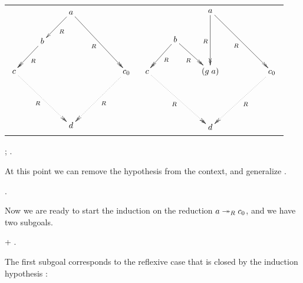         \begin{tabular}{c@{\hskip 0.5cm}c} $\xymatrix{ & & a
        \ar@{->>}[ddrr]_R \ar@{->}[dl]^R & & \\ & b \ar@{->>}[dl]^R &
        & & \\ c \ar@{.>>}[ddrr]_R & & & & c_0 \ar@{.>>}[ddll]^R \\ &
        & & & \\ & & d & & }$ & $\xymatrix{ & & a \ar@{->>}[ddrr]_R
        \ar@{->>}[dd]_R & & \\ & b \ar@{->>}[dl]^R \ar@{->>}[dr]_R & &
        & \\ c \ar@{.>>}[ddrr]_R & & (g \; a) & & c_0
        \ar@{.>>}[ddll]^R \\ & & & & \\ & & d & & }$ \end{tabular} \begin{coqdoccode}
\coqdocnoindent
\coqdoceol
\coqdocindent{2.00em}
 ;   . \end{coqdoccode}
At this point we can remove
      the hypothesis  from the context, and generalize . \begin{coqdoccode}
\coqdocemptyline
\coqdocindent{2.00em}
 . \end{coqdoccode}
Now we are ready to start the induction on
    the reduction $a\twoheadrightarrow_R c_0$, and we have two subgoals. \begin{coqdoccode}
\coqdocemptyline
\coqdocindent{2.00em}
+     . \end{coqdoccode}
The first subgoal corresponds
        to the reflexive case that is closed by the induction
        hypothesis :


